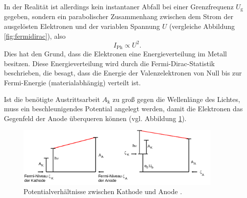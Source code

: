 In der Realität ist allerdings kein instantaner Abfall bei einer Grenzfrequenz $U_{\mathrm{g}}$
gegeben, sondern ein parabolischer Zusammenhang zwischen dem Strom der ausgelösten Elektronen
und der variablen Spannung $U$ (vergleiche Abbildung \ref{fig:fermidirac}), also
\begin{equation*}
	I_{\mathrm{Ph}} \propto U^2 \mathrm{.}
\end{equation*}
Dies hat den Grund, dass die Elektronen eine Energieverteilung im Metall besitzen. Diese
Energieverteilung wird durch die Fermi-Dirac-Statistik beschrieben, die besagt, dass die
Energie der Valenzelektronen von Null bis zur Fermi-Energie (materialabhängig) verteilt ist.

Ist die benötigte Austrittsarbeit $A_{\mathrm{k}}$ zu groß gegen die Wellenlänge des Lichtes,
muss ein beschleunigendes Potential angelegt werden, damit die Elektronen das Gegenfeld der
Anode überqueren können (vgl. Abbildung \ref{fig:potentialverteilung}).
\begin{figure}
  \centering
  \includegraphics[width=0.90\textwidth]{Bilder/fermi.png}
  \caption{Potentialverhältnisse zwischen Kathode und Anode \cite{Anleitung}.}
  \label{fig:potentialverteilung}
\end{figure}
